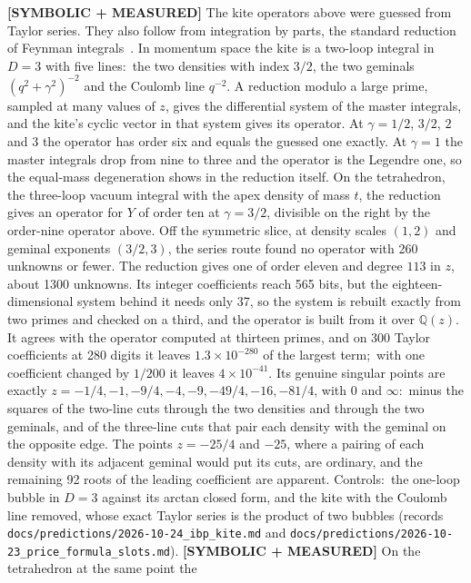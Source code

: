 \documentclass[aps,pra,twocolumn,superscriptaddress,longbibliography]{revtex4-2}
\begin{document}
\textbf{[SYMBOLIC + MEASURED]} The kite operators above were guessed from
Taylor series.  They also follow from integration by parts, the standard
reduction of Feynman integrals~\cite{chetyrkin_tkachov1981,laporta2000}.  In
momentum space the kite is a two-loop integral in $D=3$ with five lines:\ the
two densities with index $3/2$, the two geminals $(q^2+\gamma^2)^{-2}$ and
the Coulomb line $q^{-2}$.  A reduction modulo a large prime, sampled at many
values of $z$, gives the differential system of the master integrals, and
the kite's cyclic vector in that system gives its operator.  At
$\gamma=1/2$, $3/2$, $2$ and $3$ the operator has order six and equals the
guessed one exactly.  At $\gamma=1$ the master integrals drop from nine to
three and the operator is the Legendre one, so the equal-mass degeneration
shows in the reduction itself.  On the tetrahedron, the three-loop vacuum
integral with the apex density of mass $t$, the reduction gives an operator
for $Y$ of order ten at $\gamma=3/2$, divisible on the right by the
order-nine operator above.  Off the symmetric slice, at density scales
$(1,2)$ and geminal exponents $(3/2,3)$, the series route found no operator
with 260 unknowns or fewer.  The reduction gives one of order eleven and
degree $113$ in $z$, about 1300 unknowns.  Its integer coefficients reach 565
bits, but the eighteen-dimensional system behind it needs only 37, so the
system is rebuilt exactly from two primes and checked on a third, and the
operator is built from it over $\mathbb{Q}(z)$.  It agrees with the operator
computed at thirteen primes, and on 300 Taylor coefficients at 280 digits it
leaves $1.3\times10^{-280}$ of the largest term;\ with one coefficient
changed by $1/200$ it leaves $4\times10^{-41}$.  Its genuine singular points
are exactly $z=-1/4,-1,-9/4,-4,-9,-49/4,-16,-81/4$, with $0$ and $\infty$:\
minus the squares of the two-line cuts through the two densities and through
the two geminals, and of the three-line cuts that pair each density with the
geminal on the opposite edge.  The points $z=-25/4$ and $-25$, where a
pairing of each density with its adjacent geminal would put its cuts, are
ordinary, and the remaining 92 roots of the leading coefficient are
apparent.  Controls:\ the one-loop bubble in $D=3$ against its arctan closed
form, and the kite with the Coulomb line removed, whose exact Taylor series
is the product of two bubbles (records
\texttt{docs/predictions/2026-10-24\_ibp\_kite.md} and
\texttt{docs/predictions/2026-10-23\_price\_formula\_slots.md}).
\textbf{[SYMBOLIC + MEASURED]} On the tetrahedron at the same point the
\end{document}

